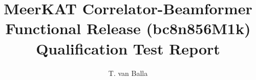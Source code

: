 \documentclass[11pt,english,twoside]{article}
\author{T. van Balla}
\begin{document}
\title{MeerKAT Correlator-Beamformer Functional Release  (bc8n856M1k) Qualification Test Report}
\makekatdocbeginning
\end{document}
